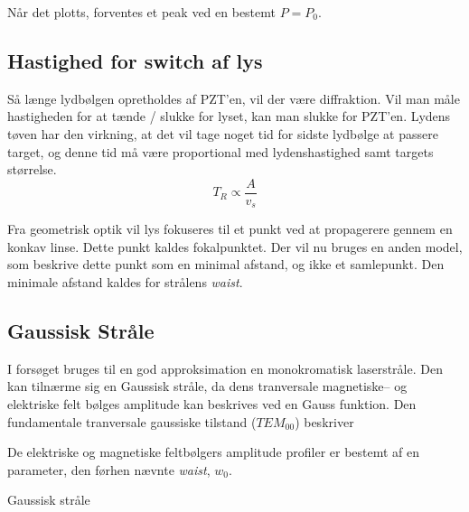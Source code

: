 \documentclass[main]{subfiles}
\begin{document}
Når det plotts, forventes et peak ved en bestemt $P=P_0$.

\subsection{Hastighed for switch af lys}
Så længe lydbølgen opretholdes af PZT'en, vil der være diffraktion. Vil man måle hastigheden for at tænde / slukke for lyset, kan man slukke for PZT'en. Lydens tøven har den virkning, at det vil tage noget tid for sidste lydbølge at passere target, og denne tid må være proportional med lydenshastighed samt targets størrelse.
\begin{equation}
    T_R \propto \frac{A}{v_s}
    \label{eq:risetime}
\end{equation}

Fra geometrisk optik vil lys fokuseres til et punkt ved at propagerere gennem en konkav linse. Dette punkt kaldes fokalpunktet.
Der vil nu bruges en anden model, som beskrive dette punkt som en minimal afstand, og ikke et samlepunkt. Den minimale afstand kaldes for strålens \emph{waist}.
\subsection{Gaussisk Stråle}
I forsøget bruges til en god approksimation en monokromatisk laserstråle. Den kan tilnærme sig en Gaussisk stråle, da dens tranversale magnetiske-- og elektriske felt bølges amplitude kan beskrives ved en Gauss funktion. Den fundamentale tranversale gaussiske tilstand ($TEM_00$) beskriver

De elektriske og magnetiske feltbølgers amplitude profiler er bestemt af en parameter, den førhen nævnte \emph{waist}, $w_0$.

Gaussisk stråle
\end{document}
